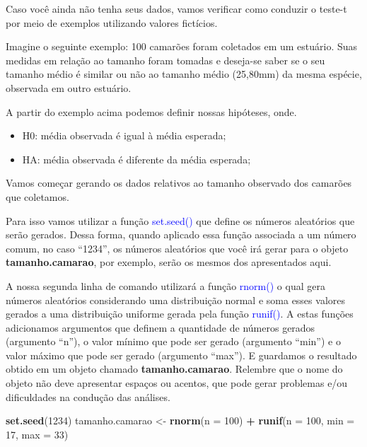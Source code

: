 \documentclass[14pt,titlepage, oneside, openany, a4paper]{book}
\newenvironment{Shaded}{\begin{snugshade}}{\end{snugshade}}
\newcommand{\DataTypeTok}[1]{\textcolor[rgb]{0.13,0.29,0.53}{#1}}
\newcommand{\DecValTok}[1]{\textcolor[rgb]{0.00,0.00,0.81}{#1}}
\newcommand{\KeywordTok}[1]{\textcolor[rgb]{0.13,0.29,0.53}{\textbf{#1}}}
\newcommand{\NormalTok}[1]{#1}
\newcommand{\OperatorTok}[1]{\textcolor[rgb]{0.81,0.36,0.00}{\textbf{#1}}}
\newcommand{\StringTok}[1]{\textcolor[rgb]{0.31,0.60,0.02}{#1}}
\providecommand{\tightlist}{%
  \setlength{\itemsep}{0pt}\setlength{\parskip}{0pt}}
\begin{document}
Caso você ainda não tenha seus dados, vamos verificar como conduzir o teste-t por meio de exemplos utilizando valores fictícios.

Imagine o seguinte exemplo: 100 camarões foram coletados em um estuário. Suas medidas em relação ao tamanho foram tomadas e deseja-se saber se o seu tamanho médio é similar ou não ao tamanho médio (25,80mm) da mesma espécie, observada em outro estuário.

A partir do exemplo acima podemos definir nossas hipóteses, onde.

\begin{itemize}
\tightlist
\item
  H0: média observada é igual à média esperada;
\item
  HA: média observada é diferente da média esperada;
\end{itemize}

Vamos começar gerando os dados relativos ao tamanho observado dos camarões que coletamos.

Para isso vamos utilizar a função \textcolor{blue}{set.seed()} que define os números aleatórios que serão gerados. Dessa forma, quando aplicado essa função associada a um número comum, no caso ``1234'', os números aleatórios que você irá gerar para o objeto \textbf{tamanho.camarao}, por exemplo, serão os mesmos dos apresentados aqui.

A nossa segunda linha de comando utilizará a função \textcolor{blue}{rnorm()} o qual gera números aleatórios considerando uma distribuição normal e soma esses valores gerados a uma distribuição uniforme gerada pela função \textcolor{blue}{runif()}. A estas funções adicionamos argumentos que definem a quantidade de números gerados (argumento ``n''), o valor mínimo que pode ser gerado (argumento ``min'') e o valor máximo que pode ser gerado (argumento ``max''). E guardamos o resultado obtido em um objeto chamado \textbf{tamanho.camarao}. Relembre que o nome do objeto não deve apresentar espaços ou acentos, que pode gerar problemas e/ou dificuldades na condução das análises.

\begin{Shaded}
\begin{Highlighting}[]
\KeywordTok{set.seed}\NormalTok{(}\DecValTok{1234}\NormalTok{)}
\NormalTok{tamanho.camarao <-}\StringTok{ }\KeywordTok{rnorm}\NormalTok{(}\DataTypeTok{n =} \DecValTok{100}\NormalTok{) }\OperatorTok{+}\StringTok{ }\KeywordTok{runif}\NormalTok{(}\DataTypeTok{n =} \DecValTok{100}\NormalTok{, }\DataTypeTok{min =} \DecValTok{17}\NormalTok{, }\DataTypeTok{max =} \DecValTok{33}\NormalTok{)}
\end{Highlighting}
\end{Shaded}
\end{document}

